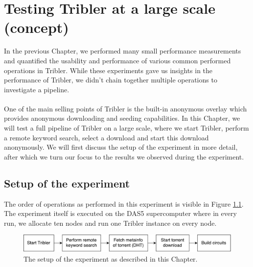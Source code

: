\chapter{Testing Tribler at a large scale (concept)}
In the previous Chapter, we performed many small performance measurements and quantified the usability and performance of various common performed operations in Tribler. While these experiments gave us insights in the performance of Tribler, we didn't chain together multiple operations to investigate a pipeline.\\\\
One of the main selling points of Tribler is the built-in anonymous overlay which provides anonymous downloading and seeding capabilities. In this Chapter, we will test a full pipeline of Tribler on a large scale, where we start Tribler, perform a remote keyword search, select a download and start this download anonymously. We will first discuss the setup of the experiment in more detail, after which we turn our focus to the results we observed during the experiment.

\section{Setup of the experiment}
The order of operations as performed in this experiment is visible in Figure \ref{fig:big-experiment-setup}. The experiment itself is executed on the DAS5 supercomputer where in every run, we allocate ten nodes and run one Tribler instance on every node.\\

\begin{figure}[!h]
	\centering
	\includegraphics[width=0.8\columnwidth]{images/big_experiment/big_experiment_setup}
	\caption{The setup of the experiment as described in this Chapter.}
	\label{fig:big-experiment-setup}
\end{figure}

